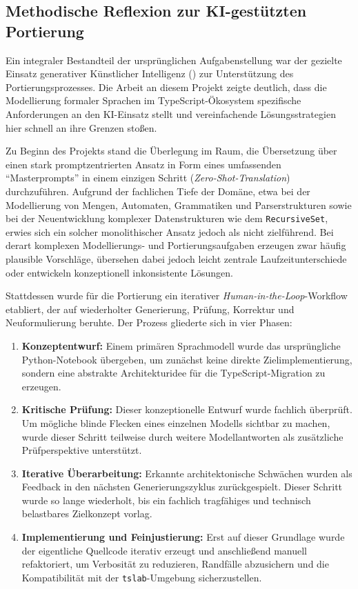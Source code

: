 
\subsection{Methodische Reflexion zur KI-gestützten Portierung}

Ein integraler Bestandteil der ursprünglichen Aufgabenstellung war der gezielte Einsatz generativer Künstlicher Intelligenz () zur Unterstützung des Portierungsprozesses. Die Arbeit an diesem Projekt zeigte deutlich, dass die Modellierung formaler Sprachen im TypeScript-Ökosystem spezifische Anforderungen an den KI-Einsatz stellt und vereinfachende Lösungsstrategien hier schnell an ihre Grenzen stoßen.

Zu Beginn des Projekts stand die Überlegung im Raum, die Übersetzung über einen stark promptzentrierten Ansatz in Form eines umfassenden \enquote{Masterprompts} in einem einzigen Schritt (\textit{Zero-Shot-Translation}) durchzuführen. Aufgrund der fachlichen Tiefe der Domäne, etwa bei der Modellierung von Mengen, Automaten, Grammatiken und Parserstrukturen sowie bei der Neuentwicklung komplexer Datenstrukturen wie dem \texttt{RecursiveSet}, erwies sich ein solcher monolithischer Ansatz jedoch als nicht zielführend. Bei derart komplexen Modellierungs- und Portierungsaufgaben erzeugen  zwar häufig plausible Vorschläge, übersehen dabei jedoch leicht zentrale Laufzeitunterschiede oder entwickeln konzeptionell inkonsistente Lösungen.

Stattdessen wurde für die Portierung ein iterativer \textit{Human-in-the-Loop}-Workflow etabliert, der auf wiederholter Generierung, Prüfung, Korrektur und Neuformulierung beruhte. Der Prozess gliederte sich in vier Phasen:

\begin{enumerate}
    \item \textbf{Konzeptentwurf:} Einem primären Sprachmodell wurde das ursprüngliche Python-Notebook übergeben, um zunächst keine direkte Zielimplementierung, sondern eine abstrakte Architekturidee für die TypeScript-Migration zu erzeugen.
    \item \textbf{Kritische Prüfung:} Dieser konzeptionelle Entwurf wurde fachlich überprüft. Um mögliche blinde Flecken eines einzelnen Modells sichtbar zu machen, wurde dieser Schritt teilweise durch weitere Modellantworten als zusätzliche Prüfperspektive unterstützt.
    \item \textbf{Iterative Überarbeitung:} Erkannte architektonische Schwächen wurden als Feedback in den nächsten Generierungszyklus zurückgespielt. Dieser Schritt wurde so lange wiederholt, bis ein fachlich tragfähiges und technisch belastbares Zielkonzept vorlag.
    \item \textbf{Implementierung und Feinjustierung:} Erst auf dieser Grundlage wurde der eigentliche Quellcode iterativ erzeugt und anschließend manuell refaktoriert, um Verbosität zu reduzieren, Randfälle abzusichern und die Kompatibilität mit der \texttt{tslab}-Umgebung sicherzustellen.
\end{enumerate}

